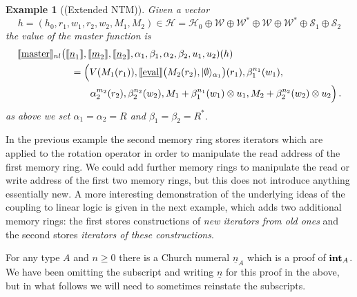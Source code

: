 \documentclass[english,letter paper,12pt,leqno]{article}
\theoremstyle{example}
\newtheorem{example}[theorem]{Example}
\numberwithin{equation}{section}
\begin{document}
\begin{example}[(Extended NTM)]
Given a vector
\[
h = (h_0, r_1, w_1, r_2, w_2, M_1, M_2) \in \mathscr{H} = \mathscr{H}_0 \oplus \mathscr{W} \oplus \mathscr{W}^* \oplus \mathscr{W} \oplus \mathscr{W}^* \oplus \mathscr{S}_1 \oplus \mathscr{S}_2
\]
the value of the master function is
\begin{align*}
\llbracket \underline{\textup{master}} \rrbracket_{nl}&\big( \llbracket \underline{n}_1 \rrbracket, \llbracket \underline{m}_2 \rrbracket, \llbracket \underline{n}_2 \rrbracket, \alpha_1, \beta_1, \alpha_2, \beta_2, u_1, u_2 )(h)\\
&\quad = \Big(V(M_1(r_1)), \llbracket \underline{\mathrm{eval}} \rrbracket\big( M_2(r_2), \lvert\emptyset\rangle_{\alpha_1} \big)(r_1), \beta_1^{n_1}(w_1),\\
&\qquad \quad \alpha_2^{m_2}(r_2), \beta_2^{n_2}(w_2), M_1 + \beta_1^{n_1}(w_1) \otimes u_1, M_2 + \beta_2^{n_2}(w_2) \otimes u_2 \Big)\,.
\end{align*}
as above we set $\alpha_1 = \alpha_2 = R$ and $\beta_1 = \beta_2 = R^*$. 
\end{example}

In the previous example the second memory ring stores iterators which are applied to the rotation operator in order to manipulate the read address of the first memory ring. We could add further memory rings to manipulate the read or write address of the first two memory rings, but this does not introduce anything essentially new. A more interesting demonstration of the underlying ideas of the coupling to linear logic is given in the next example, which adds two additional memory rings: the first stores constructions of \emph{new iterators from old ones} and the second stores \emph{iterators of these constructions}.

For any type $A$ and $n \ge 0$ there is a Church numeral $\underline{n}_A$ which is a proof of $\textbf{int}_A$. We have been omitting the subscript and writing $\underline{n}$ for this proof in the above, but in what follows we will need to sometimes reinstate the subscripts.
\end{document}

